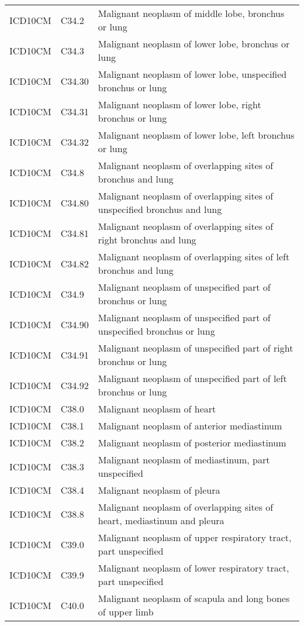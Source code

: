 \begin{table}[ht]
\begin{tabular}{lll}
  ICD10CM & C34.2 & Malignant neoplasm of middle lobe, bronchus or lung \\ 
  ICD10CM & C34.3 & Malignant neoplasm of lower lobe, bronchus or lung \\ 
  ICD10CM & C34.30 & Malignant neoplasm of lower lobe, unspecified bronchus or lung \\ 
  ICD10CM & C34.31 & Malignant neoplasm of lower lobe, right bronchus or lung \\ 
  ICD10CM & C34.32 & Malignant neoplasm of lower lobe, left bronchus or lung \\ 
  ICD10CM & C34.8 & Malignant neoplasm of overlapping sites of bronchus and lung \\ 
  ICD10CM & C34.80 & Malignant neoplasm of overlapping sites of unspecified bronchus and lung \\ 
  ICD10CM & C34.81 & Malignant neoplasm of overlapping sites of right bronchus and lung \\ 
  ICD10CM & C34.82 & Malignant neoplasm of overlapping sites of left bronchus and lung \\ 
  ICD10CM & C34.9 & Malignant neoplasm of unspecified part of bronchus or lung \\ 
  ICD10CM & C34.90 & Malignant neoplasm of unspecified part of unspecified bronchus or lung \\ 
  ICD10CM & C34.91 & Malignant neoplasm of unspecified part of right bronchus or lung \\ 
  ICD10CM & C34.92 & Malignant neoplasm of unspecified part of left bronchus or lung \\ 
  ICD10CM & C38.0 & Malignant neoplasm of heart \\ 
  ICD10CM & C38.1 & Malignant neoplasm of anterior mediastinum \\ 
  ICD10CM & C38.2 & Malignant neoplasm of posterior mediastinum \\ 
  ICD10CM & C38.3 & Malignant neoplasm of mediastinum, part unspecified \\ 
  ICD10CM & C38.4 & Malignant neoplasm of pleura \\ 
  ICD10CM & C38.8 & Malignant neoplasm of overlapping sites of heart, mediastinum and pleura \\ 
  ICD10CM & C39.0 & Malignant neoplasm of upper respiratory tract, part unspecified \\ 
  ICD10CM & C39.9 & Malignant neoplasm of lower respiratory tract, part unspecified \\ 
  ICD10CM & C40.0 & Malignant neoplasm of scapula and long bones of upper limb \\ 

\end{tabular}
\end{table}
